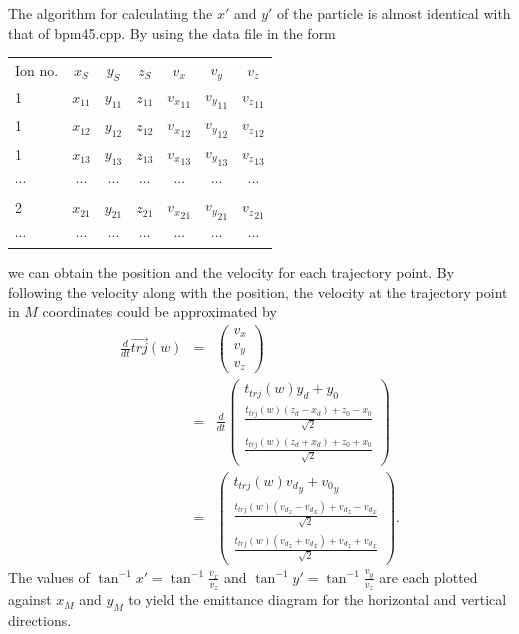 \documentclass{article}
\begin{document}
The algorithm for calculating the $x'$ and $y'$ of the particle is almost identical with that of bpm45.cpp. By using the data file in the form
\begin{table}[H]
  \begin{tabular}{lcccccc}
    Ion no. & $x_S$ & $y_S$  & $z_S$ & $v_x$ & $v_y$ & $v_z$ \\
    1 & $x_{11}$ & $y_{11}$ & $z_{11}$ & ${v_x}_{11}$ & ${v_y}_{11}$ & ${v_z}_{11}$ \\
    1 & $x_{12}$ & $y_{12}$ & $z_{12}$ & ${v_x}_{12}$ & ${v_y}_{12}$ & ${v_z}_{12}$ \\
    1 & $x_{13}$ & $y_{13}$ & $z_{13}$ & ${v_x}_{13}$ & ${v_y}_{13}$ & ${v_z}_{13}$ \\
    $\cdots$ & $\cdots$ & $\cdots$ & $\cdots$ & $\cdots$ & $\cdots$ & $\cdots$ \\
    2 & $x_{21}$ & $y_{21}$ & $z_{21}$ & ${v_x}_{21}$ & ${v_y}_{21}$ & ${v_z}_{21}$ \\
    $\cdots$ & $\cdots$ & $\cdots$ & $\cdots$ & $\cdots$ & $\cdots$ & $\cdots$ 
  \end{tabular}
\end{table}
we can obtain the position and the velocity for each trajectory point. By following the velocity along with the position, the velocity at the trajectory point in $M$ coordinates could be approximated by
\begin{eqnarray*}
\frac{d}{dt} \vec{trj}(w) & = & \left(
\begin{array}{c}
	v_x \\
	v_y \\
	v_z
\end{array} \right) \\
& = & \frac{d}{dt} \left(
\begin{array}{c}
	t_{trj}(w) y_d + y_0 \\
	\frac{t_{trj}(w) \left( z_d-x_d \right) + z_0-x_0}{\sqrt{2}} \\
	\frac{t_{trj}(w) \left( z_d+x_d \right) + z_0+x_0}{\sqrt{2}}
\end{array} \right) \\
& = & \left(
\begin{array}{c}
	t_{trj}(w) {v_d}_y + {v_0}_y \\
	\frac{t_{trj}(w) \left({v_d}_z-{v_d}_x\right) + {v_d}_z-{v_d}_x}{\sqrt{2}} \\
	\frac{t_{trj}(w) \left({v_d}_z+{v_d}_x\right) + {v_d}_z+{v_d}_x}{\sqrt{2}}
\end{array} \right).
\end{eqnarray*}
The values of $\tan^{-1}{x'} = \tan^{-1}{\frac{v_x}{v_z}}$ and $\tan^{-1}{y'} = \tan^{-1}{\frac{v_y}{v_z}}$ are each plotted against $x_M$ and $y_M$ to yield the emittance diagram for the horizontal and vertical directions.
\end{document}
